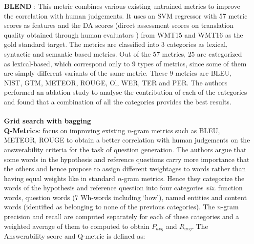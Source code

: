 \textbf{BLEND} : This metric combines various existing untrained metrics to improve the correlation with human judgements. It uses an SVM regressor with 57 metric scores as features and the DA scores (direct assessment scores on translation quality obtained through human evaluators ) from WMT15 and WMT16 as the gold standard target. The metrics are classified into 3 categories as lexical, syntactic and semantic based metrics. Out of the 57 metrics, 25 are categorized as lexical-based, which correspond only to 9 types of metrics, since some of them are simply different variants of the same metric.   These 9 metrics are BLEU, NIST, GTM, METEOR, ROUGE, Ol, WER, TER and PER.   The authors performed an ablation study to analyse the contribution of each of the categories and found that a combination of all the categories provides the best results. \\
\\
\textbf{Grid search with bagging}\\
\textbf{Q-Metrics}:  focus on improving existing $n$-gram metrics such as BLEU, METEOR, ROUGE to obtain a better correlation with human judgements on the answerability criteria for the task of question generation. The authors argue that some words in the hypothesis and reference questions carry more importance that the others and hence propose to assign different weightages to words rather than having equal weights like in standard $n$-gram metrics. 
Hence they categorize the words of the hypothesis and reference question into four categories \textit{viz.} function words, question words (7 Wh-words including `how'), named entities and content words (identified as belonging to none of the previous categories). The $n$-gram precision and recall are computed separately for each of these categories and a weighted average of them to computed to obtain $P_{avg}$ and $R_{avg}$. The Answerability score and Q-metric is defined as:
